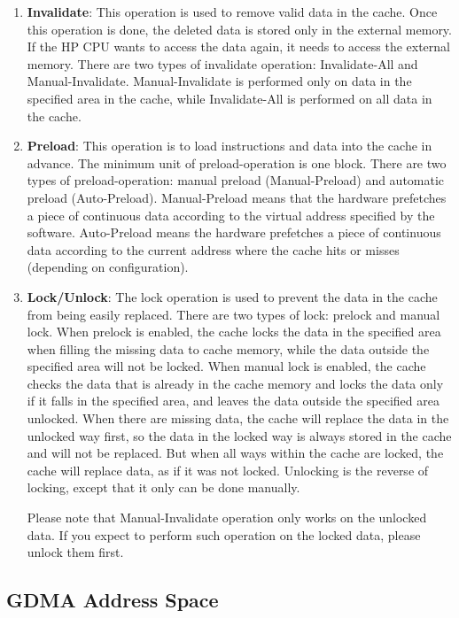 \documentclass[main\_\_EN.tex]{subfiles}
\begin{document}
\begin{enumerate}
\item \textbf{Invalidate}: This operation is used to remove valid data in the cache. Once this operation is done, the deleted data is stored only in the external memory. If the HP CPU wants to access the data again, it needs to access the external memory. There are two types of invalidate operation: Invalidate-All and Manual-Invalidate. Manual-Invalidate is performed only on data in the specified area in the cache, while Invalidate-All is performed on all data in the cache.

\item \textbf{Preload}: This operation is to load instructions and data into the cache in advance. The minimum unit of preload-operation is one block. There are two types of preload-operation: manual preload (Manual-Preload) and automatic preload (Auto-Preload). Manual-Preload means that the hardware prefetches a piece of continuous data according to the virtual address specified by the software. Auto-Preload means the hardware prefetches a piece of continuous data according to the current address where the cache hits or misses (depending on configuration).


\item \textbf{Lock/Unlock}: The lock operation is used to prevent the data in the cache from being easily replaced. There are two types of lock: prelock and manual lock. When prelock is enabled, the cache locks the data in the specified area when filling the missing data to cache memory, while the data outside the specified area will not be locked. When manual lock is enabled, the cache checks the data that is already in the cache memory and locks the data only if it falls in the specified area, and leaves the data outside the specified area unlocked.
When there are missing data, the cache will replace the data in the unlocked way first, so the data in the locked way is always stored in the cache and will not be replaced. But when all ways within the cache are locked, the cache will replace data, as if it was not locked. Unlocking is the reverse of locking, except that it only can be done manually.

Please note that Manual-Invalidate operation only works on the unlocked data. If you expect to perform such operation on the locked data, please unlock them first.
\end{enumerate}

\subsection{GDMA Address Space}
\end{document}
